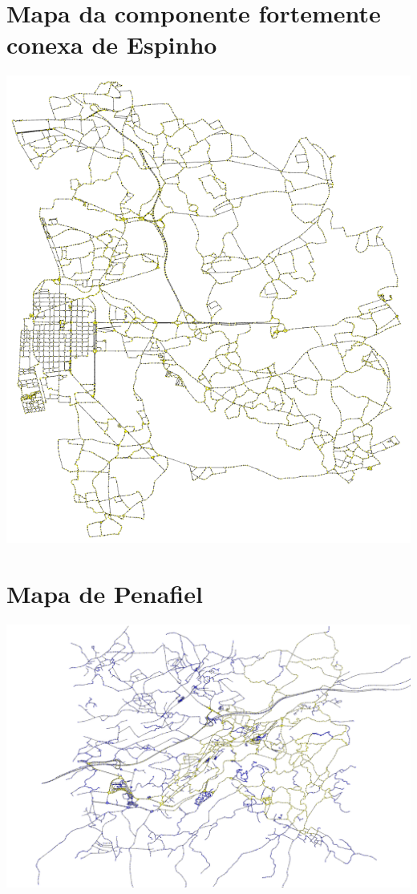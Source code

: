 \documentclass[12pt,a4paper]{report}
\begin{document}
\section{Mapa da componente fortemente conexa de Espinho}
\includegraphics[width=1.0\textwidth]{./imgs/scc/espinhoStrongSCC.png}


\section{Mapa de Penafiel}
\includegraphics[width=1.0\textwidth]{./imgs/scc/penafielSCC.png}
\end{document}
